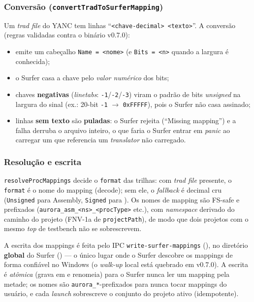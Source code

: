 \subsubsection{Conversão (\lstinline|convertTradToSurferMapping|)}

Um \emph{trad file} do YANC tem linhas \enquote{\lstinline|<chave-decimal> <texto>|}.
A conversão (regras validadas contra o binário v0.7.0):

\begin{itemize}
  \item emite um cabeçalho \lstinline|Name = <nome>| (e \lstinline|Bits = <n>|
        quando a largura é conhecida);
  \item o Surfer casa a chave pelo \emph{valor numérico} dos bits;
  \item chaves \textbf{negativas} (\emph{linetabs}: \lstinline|-1|/\lstinline|-2|/\lstinline|-3|)
        viram o padrão de bits \emph{unsigned} na largura do sinal (ex.: 20-bit
        \lstinline|-1| $\rightarrow$ \lstinline|0xFFFFF|), pois o Surfer não casa
        assinado;
  \item linhas \textbf{sem texto} são \textbf{puladas}: o Surfer rejeita
        (\enquote{Missing mapping}) e a falha derruba o arquivo inteiro, o que faria
        o Surfer entrar em \emph{panic} ao carregar um  que
        referencia um \emph{translator} não carregado.
\end{itemize}

\subsubsection{Resolução e escrita}

\lstinline|resolveProcMappings| decide o \lstinline|format| das trilhas: com
\emph{trad file} presente, o \lstinline|format| é o nome do mapping (decode); sem
ele, o \emph{fallback} é decimal cru (\lstinline|Unsigned| para Assembly,
\lstinline|Signed| para \cmm{}). Os nomes de mapping são FS-safe e prefixados
(\lstinline|aurora_asm_<ns>_<procType>| etc.), com \emph{namespace} derivado do
caminho do projeto (FNV-1a de \lstinline|projectPath|), de modo que dois projetos
com o mesmo \emph{top} de testbench não se sobrescrevem.

A escrita dos mappings é feita pelo IPC \lstinline|write-surfer-mappings|
(), no diretório \textbf{global} do Surfer
() — o único lugar onde o
Surfer descobre os mappings de forma confiável no Windows (o \emph{walk-up} local
 está quebrado em v0.7.0). A escrita é \emph{atômica} (grava em
 e renomeia) para o Surfer nunca ler um mapping pela metade; os
nomes são \lstinline|aurora_*|-prefixados para nunca tocar mappings do usuário, e
cada \emph{launch} sobrescreve o conjunto do projeto ativo (idempotente).

